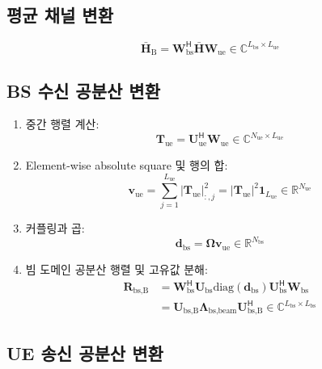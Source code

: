 \documentclass[10pt]{article}
\begin{document}
\subsection{평균 채널 변환}
\begin{equation}
\bar{\mathbf{H}}_{\text{B}} = \mathbf{W}_{\text{bs}}^{\mathsf{H}} \bar{\mathbf{H}} \mathbf{W}_{\text{ue}} \in \mathbb{C}^{L_{\text{bs}} \times L_{\text{ue}}}
\end{equation}

\subsection{BS 수신 공분산 변환}

\begin{enumerate}
\item 중간 행렬 계산:
\begin{equation}
\mathbf{T}_{\text{ue}} = \mathbf{U}_{\text{ue}}^{\mathsf{H}} \mathbf{W}_{\text{ue}} \in \mathbb{C}^{N_{\text{ue}} \times L_{\text{ue}}}
\end{equation}

\item Element-wise absolute square 및 행의 합:
\begin{equation}
\mathbf{v}_{\text{ue}} = \sum_{j=1}^{L_{\text{ue}}} |\mathbf{T}_{\text{ue}}|^2_{:,j} = |\mathbf{T}_{\text{ue}}|^2 \mathbf{1}_{L_{\text{ue}}} \in \mathbb{R}^{N_{\text{ue}}}
\end{equation}

\item 커플링과 곱:
\begin{equation}
\mathbf{d}_{\text{bs}} = \boldsymbol{\Omega} \mathbf{v}_{\text{ue}} \in \mathbb{R}^{N_{\text{bs}}}
\end{equation}

\item 빔 도메인 공분산 행렬 및 고유값 분해:
\begin{align}
\mathbf{R}_{\text{bs,B}} 
&= \mathbf{W}_{\text{bs}}^{\mathsf{H}} \mathbf{U}_{\text{bs}} \text{diag}(\mathbf{d}_{\text{bs}}) \mathbf{U}_{\text{bs}}^{\mathsf{H}} \mathbf{W}_{\text{bs}}  \\
&= \mathbf{U}_{\text{bs,B}} \mathbf{\Lambda}_{\text{bs,beam}} \mathbf{U}_{\text{bs,B}}^{\mathsf{H}} \in \mathbb{C}^{L_{\text{bs}} \times L_{\text{bs}}}
\end{align}
\end{enumerate}

\subsection{UE 송신 공분산 변환}
\end{document}
